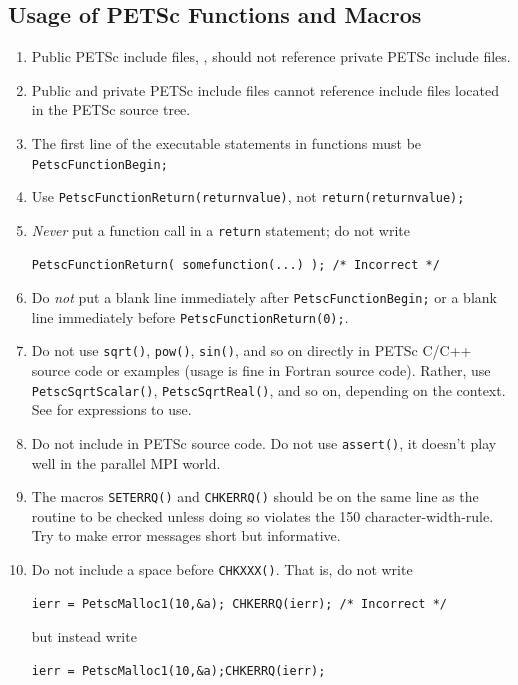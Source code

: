 \subsection{Usage of PETSc Functions and Macros}
\label{sec:stylepetsc}
\begin{enumerate}
\item Public PETSc include files, , should not reference private PETSc  include files.
\item Public and private PETSc include files cannot reference include files located in the PETSc source tree.
\item The first line of the executable statements in functions must be \lstinline{PetscFunctionBegin;}
\item Use \lstinline{PetscFunctionReturn(returnvalue)}, not \lstinline{return(returnvalue);}
\item {\em Never} put a function call in a \lstinline{return} statement; do not write
\begin{lstlisting}
PetscFunctionReturn( somefunction(...) ); /* Incorrect */
\end{lstlisting}
\item Do {\em not} put a blank line immediately after \lstinline{PetscFunctionBegin;} or
  a blank line immediately before \lstinline{PetscFunctionReturn(0);}.
\item Do not use \lstinline{sqrt()}, \lstinline{pow()}, \lstinline{sin()}, and so on directly in PETSc C/C++ source code or examples (usage is fine in Fortran source code).
  Rather, use \lstinline{PetscSqrtScalar()}, \lstinline{PetscSqrtReal()}, and so on, depending on the context.
  See  for expressions to use.
\item Do not include  in PETSc source code. Do not use \lstinline{assert()}, it doesn't play well in the parallel MPI world.
\item The macros \lstinline{SETERRQ()} and \lstinline{CHKERRQ()} should be on the
  same line as the routine to be checked unless doing so violates the
  150 character-width-rule. Try to make error messages short but
  informative.
\item Do not include a space before \lstinline{CHKXXX()}.
  That is, do not write
\begin{lstlisting}
ierr = PetscMalloc1(10,&a); CHKERRQ(ierr); /* Incorrect */
\end{lstlisting}
but instead write
\begin{lstlisting}
ierr = PetscMalloc1(10,&a);CHKERRQ(ierr);

\end{lstlisting}
\end{enumerate}
